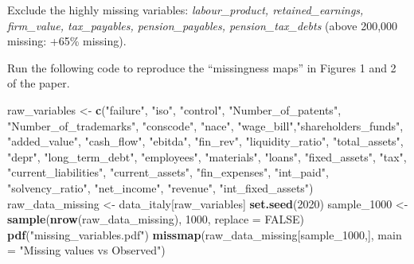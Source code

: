 \documentclass[]{article}
\newenvironment{Shaded}{\begin{snugshade}}{\end{snugshade}}
\newcommand{\DataTypeTok}[1]{\textcolor[rgb]{0.13,0.29,0.53}{#1}}
\newcommand{\DecValTok}[1]{\textcolor[rgb]{0.00,0.00,0.81}{#1}}
\newcommand{\KeywordTok}[1]{\textcolor[rgb]{0.13,0.29,0.53}{\textbf{#1}}}
\newcommand{\NormalTok}[1]{#1}
\newcommand{\OtherTok}[1]{\textcolor[rgb]{0.56,0.35,0.01}{#1}}
\newcommand{\StringTok}[1]{\textcolor[rgb]{0.31,0.60,0.02}{#1}}
\begin{document}
Exclude the highly missing variables:
\textit{labour\_product, retained\_earnings, firm\_value, tax\_payables, pension\_payables, pension\_tax\_debts}
(above 200,000 missing: +65\% missing).

Run the following code to reproduce the ``missingness maps'' in Figures
1 and 2 of the paper.

\begin{Shaded}
\begin{Highlighting}[]
\NormalTok{raw_variables <-}\StringTok{ }\KeywordTok{c}\NormalTok{(}\StringTok{"failure"}\NormalTok{, }\StringTok{"iso"}\NormalTok{, }\StringTok{"control"}\NormalTok{, }\StringTok{"Number_of_patents"}\NormalTok{,}
                   \StringTok{"Number_of_trademarks"}\NormalTok{, }\StringTok{"conscode"}\NormalTok{, }\StringTok{"nace"}\NormalTok{,}
                   \StringTok{"wage_bill"}\NormalTok{,}\StringTok{"shareholders_funds"}\NormalTok{, }\StringTok{"added_value"}\NormalTok{,}
                   \StringTok{"cash_flow"}\NormalTok{, }\StringTok{"ebitda"}\NormalTok{, }\StringTok{"fin_rev"}\NormalTok{, }\StringTok{"liquidity_ratio"}\NormalTok{,}
                   \StringTok{"total_assets"}\NormalTok{, }\StringTok{"depr"}\NormalTok{, }\StringTok{"long_term_debt"}\NormalTok{, }\StringTok{"employees"}\NormalTok{,}
                   \StringTok{"materials"}\NormalTok{, }\StringTok{"loans"}\NormalTok{, }\StringTok{"fixed_assets"}\NormalTok{, }\StringTok{"tax"}\NormalTok{,}
                   \StringTok{"current_liabilities"}\NormalTok{, }\StringTok{"current_assets"}\NormalTok{, }
                   \StringTok{"fin_expenses"}\NormalTok{, }\StringTok{"int_paid"}\NormalTok{, }\StringTok{"solvency_ratio"}\NormalTok{,}
                   \StringTok{"net_income"}\NormalTok{, }\StringTok{"revenue"}\NormalTok{, }\StringTok{"int_fixed_assets"}\NormalTok{) }
\NormalTok{raw_data_missing <-}\StringTok{ }\NormalTok{data_italy[raw_variables]}
\KeywordTok{set.seed}\NormalTok{(}\DecValTok{2020}\NormalTok{)}
\NormalTok{sample_}\DecValTok{1000}\NormalTok{ <-}\StringTok{ }\KeywordTok{sample}\NormalTok{(}\KeywordTok{nrow}\NormalTok{(raw_data_missing),}
                      \DecValTok{1000}\NormalTok{, }\DataTypeTok{replace =} \OtherTok{FALSE}\NormalTok{)}
\KeywordTok{pdf}\NormalTok{(}\StringTok{"missing_variables.pdf"}\NormalTok{) }
\KeywordTok{missmap}\NormalTok{(raw_data_missing[sample_}\DecValTok{1000}\NormalTok{,],}
        \DataTypeTok{main =} \StringTok{"Missing values vs Observed"}\NormalTok{) }
\end{Highlighting}
\end{Shaded}
\end{document}
